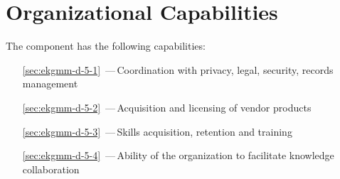 \chapter{Organizational Capabilities}\label{ch:ekg-mm-d-5}

The  component has the following capabilities:

\begin{itemize}[leftmargin=.5in]
  \item [\ref{sec:ekgmm-d-5-1}] \,---\,Coordination with privacy, legal, security, records management
  \item [\ref{sec:ekgmm-d-5-2}] \,---\,Acquisition and licensing of vendor products
  \item [\ref{sec:ekgmm-d-5-3}] \,---\,Skills acquisition, retention and training
  \item [\ref{sec:ekgmm-d-5-4}] \,---\,Ability of the organization to facilitate knowledge collaboration
\end{itemize}









